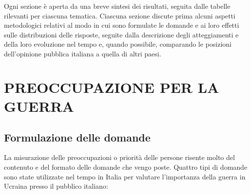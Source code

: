 \documentclass[
]{book}
\begin{document}
Ogni sezione è aperta da una breve sintesi dei risultati, seguita dalle tabelle rilevanti per ciascuna tematica. Ciascuna sezione discute prima alcuni aspetti metodologici relativi al modo in cui sono formulate le domande e ai loro effetti sulle distribuzioni delle risposte, seguite dalla descrizione degli atteggiamenti e della loro evoluzione nel tempo e, quando possibile, comparando le posizioni dell'opinione pubblica italiana a quella di altri paesi.

\hypertarget{preoccupazione-per-la-guerra}{%
\chapter{PREOCCUPAZIONE PER LA GUERRA}\label{preoccupazione-per-la-guerra}}

\hypertarget{formulazione-delle-domande}{%
\section{Formulazione delle domande}\label{formulazione-delle-domande}}

La misurazione delle preoccupazioni o priorità delle persone risente molto del contenuto e del formato delle domande che vengo poste. Quattro tipi di domande sono state utilizzate nel tempo in Italia per valutare l'importanza della guerra in Ucraina presso il pubblico italiano:
\end{document}
